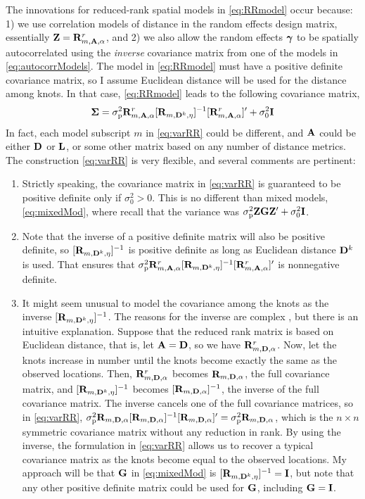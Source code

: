 \documentclass[11pt, titlepage]{article}\usepackage[]{graphicx}\usepackage[]{color}
\begin{document}
\begin{spacing}{1.9}
\begin{flushleft}
The innovations for reduced-rank spatial models in \ref{eq:RRmodel} occur because: 1) we use correlation models of distance in the random effects design matrix, essentially $\mathbf{Z} = \mathbf{R}^r_{m,\mathbf{A},\alpha}$, and 2) we also allow the random effects $\mbox{\boldmath $\gamma$}$ to be spatially autocorrelated using the \emph{inverse} covariance matrix from one of the models in \ref{eq:autocorrModels}.  The model in \ref{eq:RRmodel} must have a positive definite covariance matrix, so I assume Euclidean distance will be used for the distance among knots.  In that case, \ref{eq:RRmodel} leads to the following covariance matrix,
\begin{equation} \label{eq:varRR}
				\mbox{\boldmath $\Sigma$} = \sigma^2_\textrm{p}\mathbf{R}^r_{m,\mathbf{A},\alpha}[\mathbf{R}_{m,\mathbf{D}^k,\eta}]^{-1}[\mathbf{R}^r_{m,\mathbf{A},\alpha}]^{\prime} + \sigma^2_0\mathbf{I}
\end{equation}
In fact, each model subscript $m$ in \ref{eq:varRR} could be different, and $\mathbf{A}$ could be either $\mathbf{D}$ or $\mathbf{L}$, or some other matrix based on any number of distance metrics.  The construction \ref{eq:varRR} is very flexible, and several comments are pertinent:
\begin{enumerate}
		\item Strictly speaking, the covariance matrix in \ref{eq:varRR} is guaranteed to be positive definite only if $\sigma_0^2 > 0$. This is no different than mixed models, \ref{eq:mixedMod}, where recall that the variance was $\sigma^2_\textrm{p}\mathbf{Z}\mathbf{G}\mathbf{Z}^{\prime} + \sigma_0^2\mathbf{I}$.  
		\item Note that the inverse of a positive definite matrix will also be positive definite, so $[\mathbf{R}_{m,\mathbf{D}^k,\eta}]^{-1}$ is positive definite as long as Euclidean distance $\mathbf{D}^k$ is used.  That ensures that $\sigma^2_\textrm{p}\mathbf{R}^r_{m,\mathbf{A},\alpha}[\mathbf{R}_{m,\mathbf{D}^k,\eta}]^{-1}[\mathbf{R}^r_{m,\mathbf{A},\alpha}]^{\prime}$ is nonnegative definite.
		\item It might seem unusual to model the covariance among the knots as the inverse $[\mathbf{R}_{m,\mathbf{D}^k,\eta}]^{-1}$. The reasons for the inverse are complex \citep{Bane:Gelf:Finl:Sang:gaus:2008},  but there is an intuitive explanation.  Suppose that the reduced rank matrix is based on Euclidean distance, that is, let $\mathbf{A} = \mathbf{D}$, so we have $\mathbf{R}^r_{m,\mathbf{D},\alpha}$. Now, let the knots increase in number until the knots become exactly the same as the observed locations. Then, $\mathbf{R}^r_{m,\mathbf{D},\alpha}$ becomes $\mathbf{R}_{m,\mathbf{D},\alpha}$, the full covariance matrix, and $[\mathbf{R}_{m,\mathbf{D}^k,\eta}]^{-1}$ becomes $[\mathbf{R}_{m,\mathbf{D},\alpha}]^{-1}$, the inverse of the full covariance matrix. The inverse cancels one of the full covariance matrices, so in \ref{eq:varRR}, $\sigma^2_\textrm{p}\mathbf{R}_{m,\mathbf{D},\alpha}[\mathbf{R}_{m,\mathbf{D},\alpha}]^{-1}[\mathbf{R}_{m,\mathbf{D},\alpha}]^{\prime} = \sigma^2_\textrm{p}\mathbf{R}_{m,\mathbf{D},\alpha}$, which is the $n \times n$ symmetric covariance matrix without any reduction in rank.  By using the inverse, the formulation in \ref{eq:varRR} allows us to recover a typical covariance matrix as the knots become equal to the observed locations.  My approach will be that $\mathbf{G}$ in \ref{eq:mixedMod} is $[\mathbf{R}_{m,\mathbf{D}^k,\eta}]^{-1} = \mathbf{I}$, but note that any other positive definite matrix could be used for $\mathbf{G}$, including $\mathbf{G} = \mathbf{I}$.

\end{enumerate}
\end{flushleft}
\end{spacing}
\end{document}
